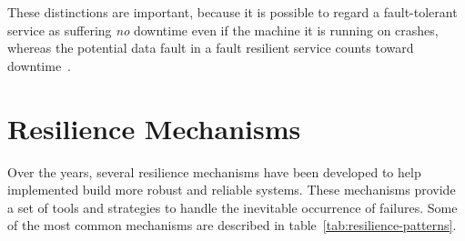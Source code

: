 These distinctions are important, because it is possible to regard a fault-tolerant service as suffering \textit{no} downtime even if the machine it is running on crashes, whereas the potential data fault in a fault resilient service counts toward downtime~\cite{fault-tolerance-vs-fault-resilience}.


\section{Resilience Mechanisms}\label{sec:resilience-mechanisms}

Over the years, several resilience mechanisms have been developed to help implemented build more robust and reliable systems. These mechanisms provide a set of tools and strategies to handle the inevitable occurrence of failures. Some of the most common mechanisms are described in table~\ref{tab:resilience-patterns}.

